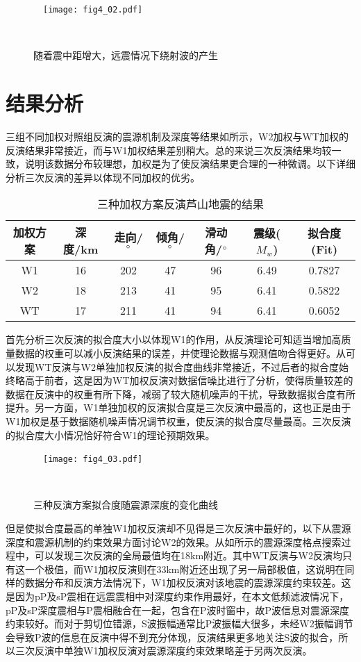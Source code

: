 \begin{figure}
\centering
  \texttt{[image: fig4\_02.pdf]}
  \caption{随着震中距增大，远震情况下绕射波的产生}
  \label{fig4_02}
\end{figure}

\section{结果分析}
三组不同加权对照组反演的震源机制及深度等结果如所示，W2加权与WT加权的反演结果非常接近，而与W1加权结果差别稍大。总的来说三次反演结果均较一致，说明该数据分布较理想，加权是为了使反演结果更合理的一种微调。以下详细分析三次反演的差异以体现不同加权的优劣。
\begin{table}[ht]
\centering
\caption{三种加权方案反演芦山地震的结果}
\label{tab4_01}
    \begin{tabular}{c c c c c c c}
    \hline
    加权方案 & 深度/km  & 走向/$^\circ$ & 倾角/$^\circ$ & 滑动角/$^\circ$ & 震级($M_w$) & 拟合度(Fit) \\
    \hline
    W1		& 16  & 202 & 47 & 96 & 6.49 & 0.7827 \\
    W2		& 18  & 213 & 41 & 95 & 6.41 & 0.5822 \\
    WT		& 17  & 211 & 41 & 94 & 6.41 & 0.6052 \\
    \hline
    \end{tabular}
\end{table}

首先分析三次反演的拟合度大小以体现W1的作用，从反演理论可知适当增加高质量数据的权重可以减小反演结果的误差，并使理论数据与观测值吻合得更好。从可以发现WT反演与W2单独加权反演的拟合度曲线非常接近，不过后者的拟合度始终略高于前者，这是因为WT加权反演对数据信噪比进行了分析，使得质量较差的数据在反演中的权重有所下降，减弱了较大随机噪声的干扰，导致数据拟合度有所提升。另一方面，W1单独加权的反演拟合度是三次反演中最高的，这也正是由于W1加权是基于数据随机噪声情况调节权重，使反演的拟合度尽量最高。三次反演的拟合度大小情况恰好符合W1的理论预期效果。
\begin{figure}
\centering
  \texttt{[image: fig4\_03.pdf]}
  \caption{三种反演方案拟合度随震源深度的变化曲线}
  \label{fig4_03}
\end{figure}

但是使拟合度最高的单独W1加权反演却不见得是三次反演中最好的，以下从震源深度和震源机制的约束效果方面讨论W2的效果。从如所示的震源深度格点搜索过程中，可以发现三次反演的全局最值均在18km附近。其中WT反演与W2反演均只有这一个极值，而W1加权反演则在33km附近还出现了另一局部极值，这说明在同样的数据分布和反演方法情况下，W1加权反演对该地震的震源深度约束较差。这是因为pP及sP震相在远震震相中对深度约束作用最好，在本文低频滤波情况下，pP及sP深度震相与P震相融合在一起，包含在P波时窗中，故P波信息对震源深度约束较好。而对于剪切位错源，S波振幅通常比P波振幅大很多，未经W2振幅调节会导致P波的信息在反演中得不到充分体现，反演结果更多地关注S波的拟合，所以三次反演中单独W1加权反演对震源深度约束效果略差于另两次反演。

